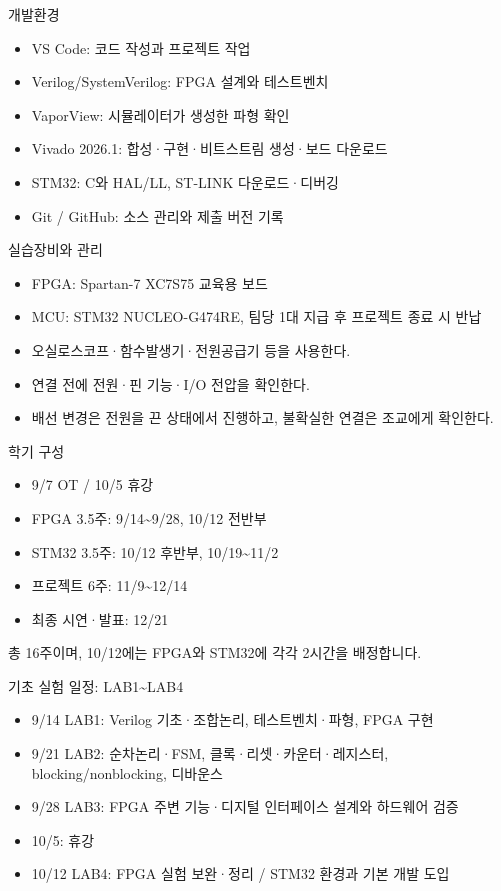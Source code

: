 \documentclass[aspectratio=169,11pt,t]{beamer}
\begin{document}
\begin{frame}{개발환경}
\begin{itemize}
\item VS Code: 코드 작성과 프로젝트 작업
\item Verilog/SystemVerilog: FPGA 설계와 테스트벤치
\item VaporView: 시뮬레이터가 생성한 파형 확인
\item Vivado 2026.1: 합성·구현·비트스트림 생성·보드 다운로드
\item STM32: C와 HAL/LL, ST-LINK 다운로드·디버깅
\item Git / GitHub: 소스 관리와 제출 버전 기록
\end{itemize}
\end{frame}

\begin{frame}{실습장비와 관리}
\begin{itemize}
\item FPGA: Spartan-7 XC7S75 교육용 보드
\item MCU: STM32 NUCLEO-G474RE, 팀당 1대 지급 후 프로젝트 종료 시 반납
\item 오실로스코프·함수발생기·전원공급기 등을 사용한다.
\item 연결 전에 전원·핀 기능·I/O 전압을 확인한다.
\item 배선 변경은 전원을 끈 상태에서 진행하고, 불확실한 연결은 조교에게 확인한다.
\end{itemize}
\end{frame}

\begin{frame}{학기 구성}
\begin{itemize}
\item 9/7 OT / 10/5 휴강
\item FPGA 3.5주: 9/14\textasciitilde{}9/28, 10/12 전반부
\item STM32 3.5주: 10/12 후반부, 10/19\textasciitilde{}11/2
\item 프로젝트 6주: 11/9\textasciitilde{}12/14
\item 최종 시연·발표: 12/21
\end{itemize}
\vspace{0.35cm}
총 16주이며, 10/12에는 FPGA와 STM32에 각각 2시간을 배정합니다.
\end{frame}

\begin{frame}{기초 실험 일정: LAB1\textasciitilde{}LAB4}
\begin{itemize}
\item 9/14 LAB1: Verilog 기초·조합논리, 테스트벤치·파형, FPGA 구현
\item 9/21 LAB2: 순차논리·FSM, 클록·리셋·카운터·레지스터, blocking/nonblocking, 디바운스
\item 9/28 LAB3: FPGA 주변 기능·디지털 인터페이스 설계와 하드웨어 검증
\item 10/5: 휴강
\item 10/12 LAB4: FPGA 실험 보완·정리 / STM32 환경과 기본 개발 도입
\end{itemize}
\end{frame}
\end{document}
